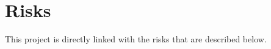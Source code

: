 \section{Risks} %
\label{sec:Risks}

This project is directly linked with the risks that are described below.







